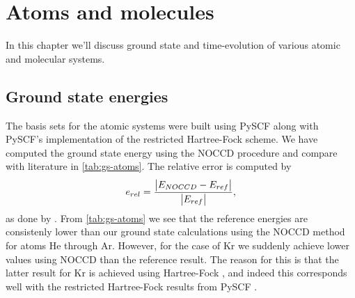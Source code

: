 \chapter{Atoms and molecules}
    In this chapter we'll discuss ground state and time-evolution of various
    atomic and molecular systems.

    \section{Ground state energies}
        The basis sets for the atomic systems were built using PySCF
        \cite{pyscf} along with PySCF's implementation of the restricted
        Hartree-Fock scheme.
        We have computed the ground state energy using the NOCCD procedure and
        compare with literature in \autoref{tab:gs-atoms}.
        The relative error is computed by
        \begin{align}
            e_{rel}
            = \frac{\abs{E_{NOCCD} - E_{ref}}}{\abs{E_{ref}}},
        \end{align}
        as done by \citeauthor{hogberget2013quantum}
        \cite{hogberget2013quantum}.
        From \autoref{tab:gs-atoms} we see that the reference energies are
        consistenly lower than our ground state calculations using the NOCCD
        method for atoms He through Ar.
        However, for the case of Kr we suddenly achieve lower values using NOCCD
        than the reference result.
        The reason for this is that the latter result for Kr is achieved using
        Hartree-Fock \cite{partridge-nhf}, and indeed this corresponds well with
        the restricted Hartree-Fock results from PySCF \cite{pyscf}.

